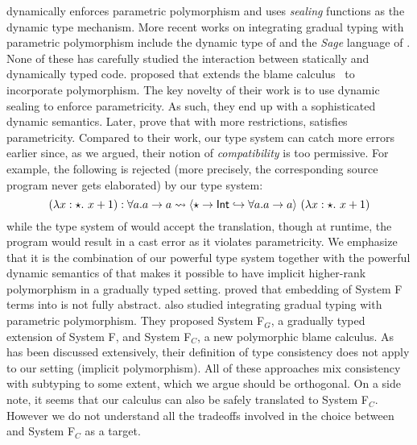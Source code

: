 \citet{Morris:1973:TS:512927.512938} dynamically enforces
parametric polymorphism and uses \emph{sealing} functions as the
dynamic type mechanism. More recent works on integrating gradual typing with
parametric polymorphism include the dynamic type of \citet{abadi1995dynamic} and
the \emph{Sage} language of \citet{gronski2006sage}. None of these has carefully
studied the interaction between statically and dynamically typed code.
\citet{ahmed2011blame} proposed \pbc that extends the blame
calculus~\cite{Wadler_2009} to incorporate polymorphism. The key novelty of
their work is to use dynamic sealing to enforce parametricity. As such, they end
up with a sophisticated dynamic semantics. Later, \citet{amal2017blame} prove
that with more restrictions, \pbc satisfies parametricity. Compared to their
work, our type system can catch more errors earlier since, as we argued, 
their notion of \emph{compatibility} is too permissive. For example, the
following is rejected (more precisely, the corresponding source program never
gets elaborated) by our type system:
\[
  (\lambda x:\star.~ x + 1) : \forall a. a \to a \rightsquigarrow \langle \star \to \mathsf{Int} \hookrightarrow \forall a. a \to a \rangle ~ (\lambda x:\star.~ x + 1)
\]
while the type system of \pbc would accept the translation, though at runtime,
the program would result in a cast error as it violates parametricity.
We emphasize that it is the combination of our powerful type system together
with the powerful dynamic semantics of \pbc that makes it possible to have
implicit higher-rank polymorphism in a gradually typed setting.
\citet{devriese2017parametricity} proved that
embedding of System F terms into \pbc is not fully abstract. \citet{yuu2017poly}
also studied integrating gradual typing with parametric polymorphism. They
proposed System F$_G$, a gradually typed extension of System F, and System
F$_C$, a new polymorphic blame calculus. As has been discussed extensively,
their definition of type consistency does not apply to our setting (implicit
polymorphism). All of these approaches mix consistency with subtyping to some
extent, which we argue should be orthogonal. On a side note, it seems that our
calculus can also be safely translated to System F$_C$. However we do not
understand all the tradeoffs involved in the choice between \pbc and System
F$_C$ as a target.



